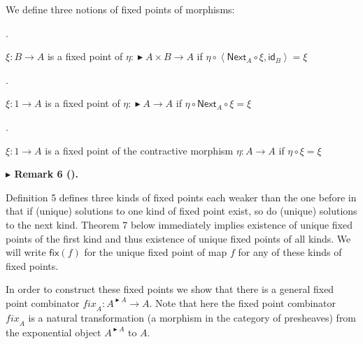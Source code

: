 \documentclass[10pt,a4paper]{article}
\begin{document}
 
We define three notions of fixed points of morphisms:\par
  
\par{}. 
 
$\xi:B\to A$ is a fixed point of $\eta:\mathop{\blacktriangleright}{}A\times B\to A$ if $\eta\circ\left<\mathsf{Next}_{A}\circ\xi,\mathsf{id}_{B}\right>=\xi$\par
 
 
 
\par{}. 
 
$\xi:1\to A$ is a fixed point of $\eta:\mathop{\blacktriangleright}{}A\to A$ if $\eta\circ\mathsf{Next}_{A}\circ\xi=\xi$\par
 
 
 
\par{}. 
 
$\xi:1\to A$ is a fixed point of the contractive morphism $\eta:A\to A$ if $\eta\circ\xi=\xi$\par
 
 
  
 
 
 
\par\medskip\noindent\textbf{$\blacktriangleright$ Remark 6 ().}\par
 
 
Definition 5 defines three kinds of fixed points each weaker than the one before in that if (unique) solutions to one kind of fixed point exist, so do (unique) solutions to the next kind. Theorem 7 below immediately implies existence of unique fixed points of the first kind and thus existence of unique fixed points of all kinds. We will write $\mathsf{fix}(f)$ for the unique fixed point of map $f$ for any of these kinds of fixed points.\par
 
 
 
 
In order to construct these fixed points we show that there is a general fixed point combinator $\mathit{fix}_{A}:A^{\mathop{\blacktriangleright}{}A}\to A$. Note that here the fixed point combinator $\mathit{fix}_{A}$ is a natural transformation (a morphism in the category of presheaves) from the exponential object $A^{\mathop{\blacktriangleright}{}A}$ to $A$.\par
 
\end{document}
